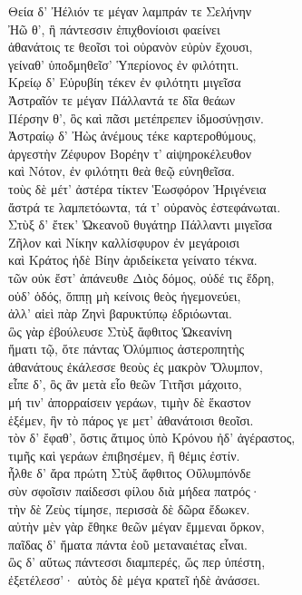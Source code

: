 \begin{pages}
\begin{Leftside}
\quad{}Θεία δ' Ἠέλιόν τε μέγαν λαμπράν τε Σελήνην \\
Ἠῶ θ', ἣ πάντεσσιν ἐπιχθονίοισι φαείνει\\
ἀθανάτοις τε θεοῖσι τοὶ οὐρανὸν εὐρὺν ἔχουσι,\\
γείναθ' ὑποδμηθεῖσ' Ὑπερίονος ἐν φιλότητι. \\
Κρείῳ δ' Εὐρυβίη τέκεν ἐν φιλότητι μιγεῖσα  \\
Ἀστραῖόν τε μέγαν Πάλλαντά τε δῖα θεάων\\
Πέρσην θ', ὃς καὶ πᾶσι μετέπρεπεν ἰδμοσύνῃσιν.\\
Ἀστραίῳ δ' Ἠὼς ἀνέμους τέκε καρτεροθύμους,\\
ἀργεστὴν Ζέφυρον Βορέην τ' αἰψηροκέλευθον \\
καὶ Νότον, ἐν φιλότητι θεὰ θεῷ εὐνηθεῖσα. \\
τοὺς δὲ μέτ' ἀστέρα τίκτεν Ἑωσφόρον Ἠριγένεια\\
ἄστρά τε λαμπετόωντα, τά τ' οὐρανὸς ἐστεφάνωται. \\

\quad{}Στὺξ δ' ἔτεκ' Ὠκεανοῦ θυγάτηρ Πάλλαντι μιγεῖσα\\
Ζῆλον καὶ Νίκην καλλίσφυρον ἐν μεγάροισι \\
καὶ Κράτος ἠδὲ Βίην ἀριδείκετα γείνατο τέκνα.  \\
τῶν οὐκ ἔστ' ἀπάνευθε Διὸς δόμος, οὐδέ τις ἕδρη,\\
οὐδ' ὁδός, ὅππῃ μὴ κείνοις θεὸς ἡγεμονεύει,\\
ἀλλ' αἰεὶ πὰρ Ζηνὶ βαρυκτύπῳ ἑδριόωνται.\\
ὣς γὰρ ἐβούλευσε Στὺξ ἄφθιτος Ὠκεανίνη\\
ἤματι τῷ, ὅτε πάντας Ὀλύμπιος ἀστεροπητὴς \\
ἀθανάτους ἐκάλεσσε θεοὺς ἐς μακρὸν Ὄλυμπον,\\
εἶπε δ', ὃς ἂν μετὰ εἷο θεῶν Τιτῆσι μάχοιτο,\\
μή τιν' ἀπορραίσειν γεράων, τιμὴν δὲ ἕκαστον\\
ἑξέμεν, ἣν τὸ πάρος γε μετ' ἀθανάτοισι θεοῖσι.\\
τὸν δ' ἔφαθ', ὅστις ἄτιμος ὑπὸ Κρόνου ἠδ' ἀγέραστος, \\
τιμῆς καὶ γεράων ἐπιβησέμεν, ἣ θέμις ἐστίν.\\
ἦλθε δ' ἄρα πρώτη Στὺξ ἄφθιτος Οὔλυμπόνδε\\
σὺν σφοῖσιν παίδεσσι φίλου διὰ μήδεα πατρός· \\
τὴν δὲ Ζεὺς τίμησε, περισσὰ δὲ δῶρα ἔδωκεν.\\
αὐτὴν μὲν γὰρ ἔθηκε θεῶν μέγαν ἔμμεναι ὅρκον, \\
παῖδας δ' ἤματα πάντα ἑοῦ μεταναιέτας εἶναι.\\
ὣς δ' αὔτως πάντεσσι διαμπερές, ὥς περ ὑπέστη,\\
ἐξετέλεσσ'· αὐτὸς δὲ μέγα κρατεῖ ἠδὲ ἀνάσσει. \\


\end{Leftside}
\end{pages}
